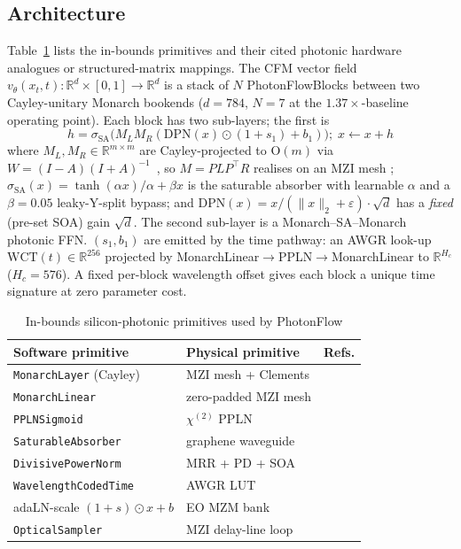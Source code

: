 \documentclass[conference]{IEEEtran}
\begin{document}
\subsection{Architecture}
\label{sec:method-arch}
Table~\ref{tab:prim} lists the in-bounds primitives and their cited
photonic hardware analogues or structured-matrix mappings.  The CFM vector field
$v_\theta(x_t,t)\colon\mathbb{R}^d\!\times\![0,1]\!\rightarrow\!
\mathbb{R}^d$ is a stack of $N$ PhotonFlowBlocks between two
Cayley-unitary Monarch bookends ($d{=}784$, $N{=}7$ at the
$1.37\times$-baseline operating point).  Each block has two
sub-layers; the first is
\begin{equation}
\label{eq:sub1}
h\!=\!\sigma_\mathrm{SA}\bigl(M_L M_R(\mathrm{DPN}(x)\!\odot\!(1{+}s_1)\!+\!b_1)\bigr);\;
x\!\leftarrow\!x{+}h
\end{equation}
where $M_L,M_R\!\in\!\mathbb{R}^{m\times m}$ are Cayley-projected
to $\mathrm{O}(m)$ via $W{=}(I{-}A)(I{+}A)^{-1}$~\cite{helfrich2018}, so $M{=}PLP^\top R$ realises on an
MZI mesh \cite{shen2017,clements2016,zhan2024};
$\sigma_\mathrm{SA}(x){=}\tanh(\alpha x)/\alpha\!+\!\beta x$ is the
saturable absorber with learnable $\alpha$ and a $\beta{=}0.05$
leaky-Y-split bypass; and
$\mathrm{DPN}(x){=}x/(\|x\|_2\!+\!\varepsilon)\cdot\sqrt{d}$ has a
\emph{fixed} (pre-set SOA) gain $\sqrt{d}$.
The second sub-layer is a Monarch--SA--Monarch photonic FFN.
$(s_1,b_1)$ are emitted by the time pathway: an AWGR look-up
$\mathrm{WCT}(t)\!\in\!\mathbb{R}^{256}$ projected by
MonarchLinear$\to$PPLN$\to$MonarchLinear to $\mathbb{R}^{H_c}$
($H_c{=}576$).  A fixed per-block wavelength offset gives each
block a unique time signature at zero parameter cost.

\begin{table}[tbp]
\caption{In-bounds silicon-photonic primitives used by PhotonFlow}
\label{tab:prim}
\centering
\setlength{\tabcolsep}{2.5pt}
\renewcommand{\arraystretch}{1.05}
\scriptsize
\begin{tabular}{@{}lll@{}}
\toprule
\textbf{Software primitive} & \textbf{Physical primitive} & \textbf{Refs.} \\
\midrule
\texttt{MonarchLayer} (Cayley)  & MZI mesh + Clements   & \cite{shen2017,clements2016,zhan2024}\\
\texttt{MonarchLinear}          & zero-padded MZI mesh   & \cite{dao2022,dao2023m2}\\
\texttt{PPLNSigmoid}            & $\chi^{(2)}$ PPLN       & \cite{ppln2026}\\
\texttt{SaturableAbsorber}      & graphene waveguide     & \cite{shen2017}\\
\texttt{DivisivePowerNorm}      & MRR + PD + SOA         & \cite{zhang2014mrr,huang2020mrr,ning2024}\\
\texttt{WavelengthCodedTime}    & AWGR LUT               & \cite{xu2021tops}\\
adaLN-scale $(1{+}s)\!\odot x{+}b$ & EO MZM bank      & \cite{shen2017,clements2016}\\
\texttt{OpticalSampler}         & MZI delay-line loop    & \cite{natcompsci2025}\\
\bottomrule
\end{tabular}
\end{table}
\end{document}
